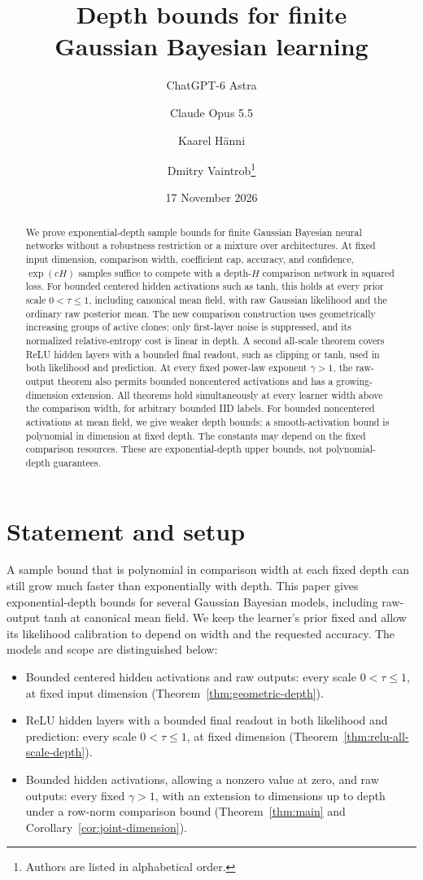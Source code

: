\documentclass[11pt]{article}
\title{Depth bounds for finite\\Gaussian Bayesian learning}
\author{ChatGPT-6 Astra \and Claude Opus 5.5 \and Kaarel H\"anni \and Dmitry Vaintrob\thanks{Authors are listed in alphabetical order.}}
\date{17 November 2026}
\begin{document}
\maketitle
\begin{abstract}
We prove exponential-depth sample bounds for finite Gaussian Bayesian neural networks without a robustness restriction or a mixture over architectures. At fixed input dimension, comparison width, coefficient cap, accuracy, and confidence, $\exp(cH)$ samples suffice to compete with a depth-$H$ comparison network in squared loss. For bounded centered hidden activations such as tanh, this holds at every prior scale $0<\tau\le1$, including canonical mean field, with raw Gaussian likelihood and the ordinary raw posterior mean. The new comparison construction uses geometrically increasing groups of active clones: only first-layer noise is suppressed, and its normalized relative-entropy cost is linear in depth. A second all-scale theorem covers ReLU hidden layers with a bounded final readout, such as clipping or tanh, used in both likelihood and prediction. At every fixed power-law exponent $\gamma>1$, the raw-output theorem also permits bounded noncentered activations and has a growing-dimension extension. All theorems hold simultaneously at every learner width above the comparison width, for arbitrary bounded IID labels. For bounded noncentered activations at mean field, we give weaker depth bounds; a smooth-activation bound is polynomial in dimension at fixed depth. The constants may depend on the fixed comparison resources. These are exponential-depth upper bounds, not polynomial-depth guarantees.
\end{abstract}

\section{Statement and setup}
A sample bound that is polynomial in comparison width at each fixed depth can still grow much faster than exponentially with depth. This paper gives exponential-depth bounds for several Gaussian Bayesian models, including raw-output tanh at canonical mean field. We keep the learner's prior fixed and allow its likelihood calibration to depend on width and the requested accuracy. The models and scope are distinguished below:
\begin{itemize}
\item Bounded centered hidden activations and raw outputs: every scale $0<\tau\le1$, at fixed input dimension (Theorem~\ref{thm:geometric-depth}).
\item ReLU hidden layers with a bounded final readout in both likelihood and prediction: every scale $0<\tau\le1$, at fixed dimension (Theorem~\ref{thm:relu-all-scale-depth}).
\item Bounded hidden activations, allowing a nonzero value at zero, and raw outputs: every fixed $\gamma>1$, with an extension to dimensions up to depth under a row-norm comparison bound (Theorem~\ref{thm:main} and Corollary~\ref{cor:joint-dimension}).
\end{itemize}
\end{document}
